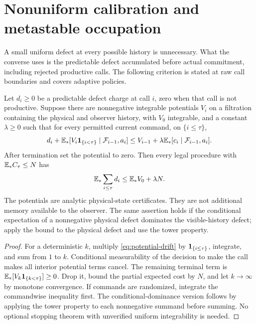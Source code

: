 \section{Nonuniform calibration and metastable occupation}
\label{sec:occupation-stability}
A small uniform defect at every possible history is unnecessary. What the converse uses is the predictable defect accumulated before actual commitment, including rejected productive calls. The following criterion is stated at raw call boundaries and covers adaptive policies.

\begin{proposition}\label{prop:potential}
Let $d_i\ge0$ be a predictable defect charge at call $i$, zero when that call is not productive. Suppose there are nonnegative integrable potentials $V_i$ on a filtration containing the physical and observer history, with $V_0$ integrable, and a constant $\lambda\ge0$ such that for every permitted current command, on $\{i\le\tau\}$,
\begin{equation}\label{eq:potential-drift}
 d_i+\mathbb E_*[V_i\mathbf1_{\{i<\tau\}}\mid\mathcal F_{i-1},a_i]
 \le V_{i-1}+\lambda\mathbb E_*[c_i\mid\mathcal F_{i-1},a_i].
\end{equation}
After termination set the potential to zero. Then every legal procedure with $\mathbb E_*C_\tau\le N$ has
\begin{equation}\label{eq:potential-bound}
 \mathbb E_*\sum_{i\le\tau}d_i\le \mathbb E_*V_0+\lambda N.
\end{equation}
The potentials are analytic physical-state certificates. They are not additional memory available to the observer. The same assertion holds if the conditional expectation of a nonnegative physical defect dominates the visible-history defect; apply the bound to the physical defect and use the tower property.
\end{proposition}
\begin{proof}
For a deterministic $k$, multiply \eqref{eq:potential-drift} by $\mathbf1_{\{i\le\tau\}}$, integrate, and sum from $1$ to $k$. Conditional measurability of the decision to make the call makes all interior potential terms cancel. The remaining terminal term is $\mathbb E_*[V_k\mathbf1_{\{k<\tau\}}]\ge0$. Drop it, bound the partial expected cost by $N$, and let $k\to\infty$ by monotone convergence. If commands are randomized, integrate the commandwise inequality first. The conditional-dominance version follows by applying the tower property to each nonnegative summand before summing. No optional stopping theorem with unverified uniform integrability is needed.
\end{proof}

